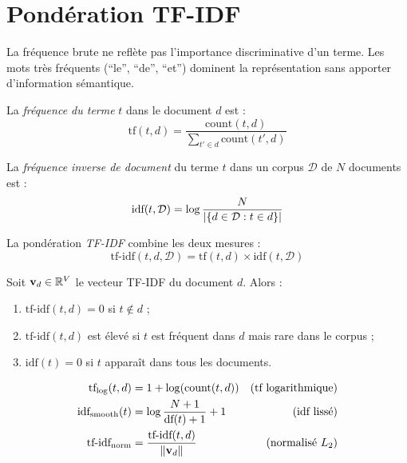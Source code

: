 \section{Pond\'eration TF-IDF}
\label{sec:rep:tfidf}

La fr\'equence brute ne refl\`ete pas l'importance discriminative d'un terme.
Les mots tr\`es fr\'equents (``le'', ``de'', ``et'') dominent la repr\'esentation
sans apporter d'information s\'emantique.

\begin{definition}
La \emph{fr\'equence du terme} $t$ dans le document $d$ est :
\[
\text{tf}(t, d) = \frac{\text{count}(t, d)}{\sum_{t' \in d} \text{count}(t', d)}
\]
\end{definition}

\begin{definition}
La \emph{fr\'equence inverse de document} du terme $t$ dans un corpus
$\mathcal{D}$ de $N$ documents est :
\[
\text{idf}(t, \mathcal{D}) = \log \frac{N}{\left| \{d \in \mathcal{D} : t \in d\} \right|}
\]
\end{definition}

\begin{definition}[TF-IDF]
La pond\'eration \emph{TF-IDF} combine les deux mesures :
\[
\text{tf-idf}(t, d, \mathcal{D}) = \text{tf}(t, d) \times \text{idf}(t, \mathcal{D})
\]
\end{definition}

\begin{theoreme}
Soit $\mathbf{v}_d \in \mathbb{R}^V$ le vecteur TF-IDF du document $d$. Alors :
\begin{enumerate}
    \item $\text{tf-idf}(t, d) = 0$ si $t \notin d$ ;
    \item $\text{tf-idf}(t, d)$ est \'elev\'e si $t$ est fr\'equent dans $d$
          mais rare dans le corpus ;
    \item $\text{idf}(t) = 0$ si $t$ appara\^it dans tous les documents.
\end{enumerate}
\end{theoreme}

\begin{formules}[title=\textbf{Variantes de TF-IDF}]
\begin{align}
\text{tf}_{\log}(t,d) &= 1 + \log(\text{count}(t,d)) & \text{(tf logarithmique)} \\
\text{idf}_{\text{smooth}}(t) &= \log\frac{N+1}{\text{df}(t)+1} + 1 & \text{(idf liss\'e)} \\
\text{tf-idf}_{\text{norm}} &= \frac{\text{tf-idf}(t,d)}{\left\| \mathbf{v}_d \right\|} & \text{(normalis\'e $L_2$)}
\end{align}
\end{formules}

